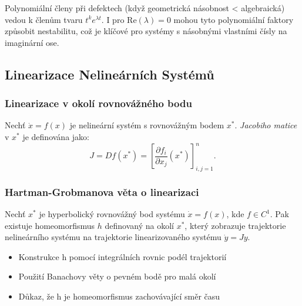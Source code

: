\begin{keyinsight}
Polynomiální členy při defektech (když geometrická násobnost < algebraická) vedou k členům tvaru $t^k e^{\lambda t}$. I pro $\mathrm{Re}(\lambda) = 0$ mohou tyto polynomiální faktory způsobit nestabilitu, což je klíčové pro systémy s násobnými vlastními čísly na imaginární ose.
\end{keyinsight}

\spc

\subsection{Linearizace Nelineárních Systémů}

\subsubsection{Linearizace v okolí rovnovážného bodu}

\begin{definition}
Nechť $\dot{x} = f(x)$ je nelineární systém s rovnovážným bodem $x^*$. \emph{Jacobiho matice} v $x^*$ je definována jako:
\[
J = Df(x^*) = \left[\frac{\partial f_i}{\partial x_j}(x^*)\right]_{i,j=1}^n.
\]
\end{definition}

\subsubsection{Hartman-Grobmanova věta o linearizaci}

\begin{theorem}
Nechť $x^*$ je hyperbolický rovnovážný bod systému $\dot{x} = f(x)$, kde $f \in C^1$. Pak existuje homeomorfismus $h$ definovaný na okolí $x^*$, který zobrazuje trajektorie nelineárního systému na trajektorie linearizovaného systému $\dot{y} = Jy$.
\end{theorem}

\begin{proofsketch}
\begin{itemize}
\item Konstrukce h pomocí integrálních rovnic podél trajektorií
\item Použití Banachovy věty o pevném bodě pro malá okolí
\item Důkaz, že h je homeomorfismus zachovávající směr času
\end{itemize}
\end{proofsketch}


